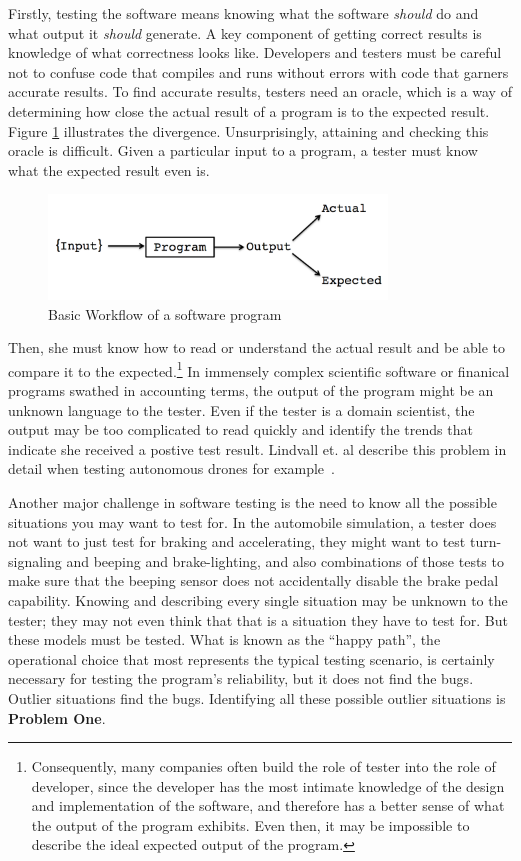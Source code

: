 Firstly, testing the software means knowing what the software \textit{should} do and what output it \textit{should} generate. A key component of getting correct results is knowledge of what correctness looks like. Developers and testers must be careful not to confuse code that compiles and runs without errors with code that garners accurate results. To find accurate results, testers need an oracle, which is a way of determining how close the actual result of a program is to the expected result. Figure \ref{fig:workflow} illustrates the divergence. Unsurprisingly, attaining and checking this oracle is difficult. Given a particular input to a program, a tester must know what the expected result even is. 
\begin{figure}
\centering
\includegraphics[width=90mm,scale=0.5]{diagram.png}
\caption{Basic Workflow of a software program}
\label{fig:workflow}
\end{figure}
Then, she must know how to read or understand the actual result and be able to compare it to the expected.\footnote{Consequently, many companies often build the role of tester into the role of developer, since the developer has the most intimate knowledge of the design and implementation of the software, and therefore has a better sense of what the output of the program exhibits. Even then, it may be impossible to describe the ideal expected output of the program.} In immensely complex scientific software or finanical programs swathed in accounting terms, the output of the program might be an unknown language to the tester. Even if the tester is a domain scientist, the output may be too complicated to read quickly and identify the trends that indicate she received a postive test result. Lindvall et. al describe this problem in detail when testing autonomous drones for example~\cite{Lindvall:2017:MMT:3103620.3103632}.

Another major challenge in software testing is the need to know all the possible situations you may want to test for. In the automobile simulation, a tester does not want to just test for braking and accelerating, they might want to test turn-signaling and beeping and brake-lighting, and also combinations of those tests to make sure that the beeping sensor does not accidentally disable the brake pedal capability. Knowing and describing every single situation may be unknown to the tester; they may not even think that that is a situation they have to test for. But these models must be tested. What is known as the ``happy path'', the operational choice that most represents the typical testing scenario, is certainly necessary for testing the program’s reliability, but it does not find the bugs. Outlier situations find the bugs. Identifying all these possible outlier situations is \textbf{Problem One}.

